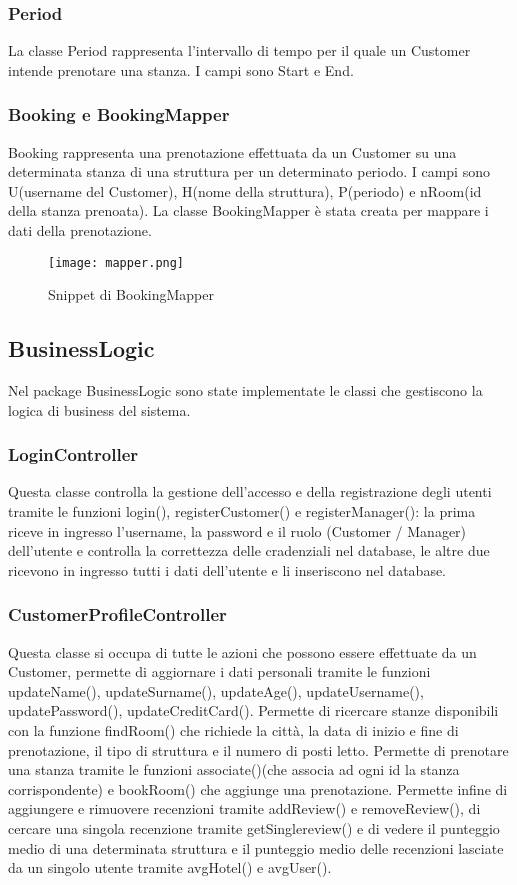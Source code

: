 \documentclass{article}
\begin{document}
\subsubsection{Period}
La classe Period rappresenta l'intervallo di tempo per il quale un Customer intende prenotare una stanza. I campi sono Start e End.
\subsubsection{Booking e BookingMapper}
Booking rappresenta una prenotazione effettuata da un Customer su una determinata stanza di una struttura per un determinato periodo. I campi sono U(username del Customer), H(nome della struttura), P(periodo) e nRoom(id della stanza prenoata). La classe BookingMapper è stata creata per mappare i dati della prenotazione.
\begin{figure}[h!]
    \centering
    \texttt{[image: mapper.png]}
    \caption{Snippet di BookingMapper}
    \label{fig:mapper}
\end{figure}
\subsection{BusinessLogic}
Nel package BusinessLogic sono state implementate le classi che gestiscono la logica di business del sistema.
\subsubsection{LoginController}
Questa classe controlla la gestione dell'accesso e della registrazione degli utenti tramite le funzioni login(), registerCustomer() e registerManager(): la prima riceve in ingresso l'username, la password e il ruolo (Customer / Manager) dell'utente e controlla la correttezza delle cradenziali nel database, le altre due ricevono in ingresso tutti i dati dell'utente e li inseriscono nel database.
\subsubsection{CustomerProfileController}
Questa classe si occupa di tutte le azioni che possono essere effettuate da un Customer, permette di aggiornare i dati personali tramite le funzioni updateName(), updateSurname(), updateAge(), updateUsername(), updatePassword(), updateCreditCard(). Permette di ricercare stanze disponibili con la funzione findRoom() che richiede la città, la data di inizio e fine di prenotazione, il tipo di struttura e il numero di posti letto. Permette di prenotare una stanza tramite le funzioni associate()(che associa ad ogni id la stanza corrispondente) e bookRoom() che aggiunge una prenotazione. Permette infine di aggiungere e rimuovere recenzioni tramite addReview() e removeReview(), di cercare una singola recenzione tramite getSinglereview() e di vedere il punteggio medio di una determinata struttura e il punteggio medio delle recenzioni lasciate da un singolo utente tramite avgHotel() e avgUser().
\end{document}
